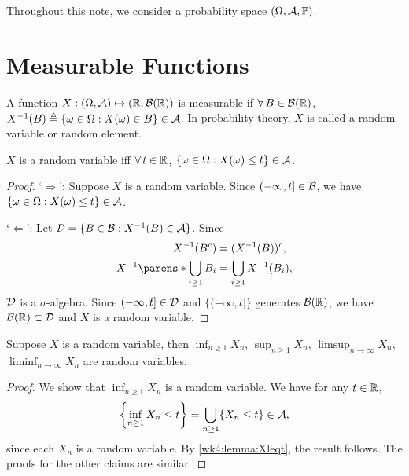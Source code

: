\documentclass[12pt]{article}
\begin{document}

Throughout this note, we consider a probability space $(\Omega,\calA,\P)$.

\section{Measurable Functions}

\begin{Definition}
A function $X :(\Omega,\mathcal{A}) \mapsto (\mathbb{R},\mathcal{B}(\mathbb{R}))$ is measurable if $\forall B\in\calBR$, $X^{-1}(B)\triangleq\{\omega \in \Omega:X(\omega) \in B\} \in \mathcal{A}$. In probability theory, $X$ is called a random variable or random element.
\end{Definition}

\begin{Lemma}\label{wk4:lemma:Xleqt}
$X$ is a random variable iff $\forall t \in \Real$, $\{\omega \in \Omega: X(\omega) \leq t\} \in \mathcal{A}$.
\end{Lemma}
\begin{proof}
`$\Rightarrow$': Suppose $X$ is a random variable. Since $(-\infty,t]\in \mathcal{B}$, we have $\{\omega \in \Omega: X(\omega) \leq t\} \in \mathcal{A}$.

`$\Leftarrow$': Let $\mathcal{D}=\{B\in\mathcal{B}: X^{-1}(B)\in \mathcal{A}\}$. Since
\begin{align*}
X^{-1}(B^c)&=(X^{-1}(B))^c,\\
X^{-1}\parens*{\bigcup_{i\geq1}{B_i}}&=\bigcup_{i\geq 1}{X^{-1}(B_i)},
\end{align*}
$\mathcal{D}$ is a $\sigma$-algebra. Since $(-\infty,t]\in\mathcal{D}$ and $\{(-\infty,t]\}$ generates $\mathcal{B}(\mathbb{R})$, we have $\mathcal{B}(\mathbb{R})\subset\mathcal{D}$ and $X$ is a random variable.
\end{proof}


\begin{Lemma}\label{lem:wk4:infX_rv}
Suppose $X$ is a random variable, then $\inf_{n\geq 1}{X_n}$, $\sup_{n\geq 1}{X_n}$, $\limsup_{n\to \infty}{X_n}$, $\liminf_{n\to \infty}{X_n}$ are random variables.
\end{Lemma}
\begin{proof}
We show that $\inf_{n\geq 1}{X_n}$ is a random variable. We have for any $t\in\mathbb{R}$,
\begin{align*}
\left\{\inf_{n\geq 1}{X_n}\leq t\right\}=\bigcup_{n \geq 1}\{X_n \leq t\} \in \mathcal{A},
\end{align*}
since each $X_n$ is a random variable. By \cref{wk4:lemma:Xleqt}, the result follows. The proofs for the other claims are similar.
\end{proof}
\end{document}
